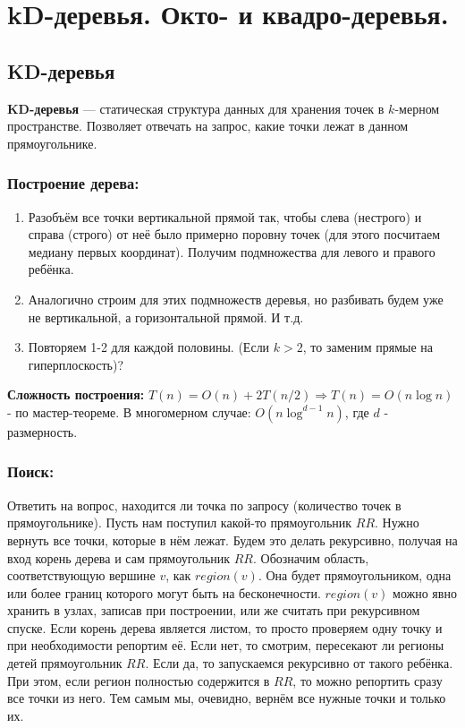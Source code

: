 \section{kD-деревья. Окто- и квадро-деревья.}

\subsection*{KD-деревья}
\textbf{KD-деревья} --- статическая структура данных для хранения точек в $k$-мерном пространстве. Позволяет отвечать на запрос, какие точки лежат в данном прямоугольнике.

\subsubsection*{Построение дерева:}
\begin{enumerate}
	\item Разобъём все точки вертикальной прямой так, чтобы слева (нестрого) и справа (строго) от неё было примерно поровну точек (для этого посчитаем медиану первых координат). Получим подмножества для левого и правого ребёнка.
	\item Аналогично строим для этих подмножеств деревья, но разбивать будем уже не вертикальной, а горизонтальной прямой. И т.д.
	\item Повторяем 1-2 для каждой половины. (Если $k>2$, то заменим прямые на гиперплоскость)?
\end{enumerate}
\textbf{Сложность построения:} $T(n)=O(n)+2T(n/2) \Rightarrow T(n)=O(n \log n)$ - по мастер-теореме.
В многомерном случае: $O(n \log^{d-1}n)$, где $d$ - размерность.

\subsubsection*{Поиск:}
Ответить на вопрос, находится ли точка по запросу (количество точек в прямоугольнике).
Пусть нам поступил какой-то прямоугольник $RR$. Нужно вернуть все точки, которые в нём лежат. Будем это делать рекурсивно, получая на вход корень дерева и сам прямоугольник $RR$. Обозначим область, соответствующую вершине $v$, как $region(v)$. Она будет прямоугольником, одна или более границ которого могут быть на бесконечности. $region(v)$ можно явно хранить в узлах, записав при построении, или же считать при рекурсивном спуске. Если корень дерева является листом, то просто проверяем одну точку и при необходимости репортим её. Если нет, то смотрим, пересекают ли регионы детей прямоугольник $RR$. Если да, то запускаемся рекурсивно от такого ребёнка. При этом, если регион полностью содержится в $RR$, то можно репортить сразу все точки из него. Тем самым мы, очевидно, вернём все нужные точки и только их.


